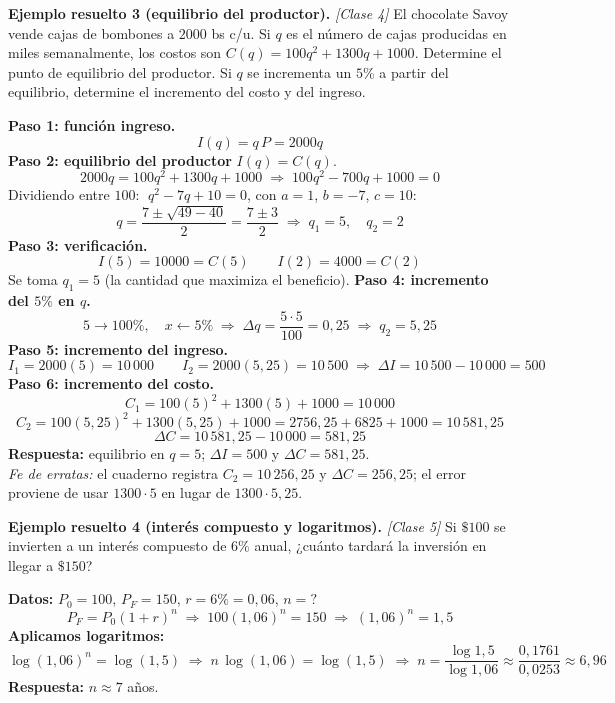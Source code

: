\documentclass[12pt, letterpaper]{article}
\begin{document}
\noindent\textbf{Ejemplo resuelto 3 (equilibrio del productor).} \emph{[Clase 4]}
El chocolate Savoy vende cajas de bombones a $2000$ bs c/u. Si $q$ es el número de cajas producidas en miles semanalmente, los costos son $C(q) = 100q^{2} + 1300q + 1000$. Determine el punto de equilibrio del productor. Si $q$ se incrementa un $5\%$ a partir del equilibrio, determine el incremento del costo y del ingreso.

\begin{cuadrosolucion}
  \textbf{Paso 1: función ingreso.}
  \[
    I(q) = q\,P = 2000q
  \]
  \textbf{Paso 2: equilibrio del productor} $I(q) = C(q)$.
  \[
    2000q = 100q^{2} + 1300q + 1000
    \;\Longrightarrow\; 100q^{2} - 700q + 1000 = 0
  \]
  Dividiendo entre $100$: $\;q^{2} - 7q + 10 = 0$, con $a=1$, $b=-7$, $c=10$:
  \[
    q = \frac{7 \pm \sqrt{49 - 40}}{2} = \frac{7 \pm 3}{2}
    \;\Longrightarrow\; q_1 = 5, \quad q_2 = 2
  \]
  \textbf{Paso 3: verificación.}
  \[
    I(5) = 10000 = C(5)
    \qquad
    I(2) = 4000 = C(2)
  \]
  Se toma $q_1 = 5$ (la cantidad que maximiza el beneficio).
  \textbf{Paso 4: incremento del $5\%$ en $q$.}
  \[
    5 \to 100\%, \quad x \leftarrow 5\%
    \;\Longrightarrow\; \Delta q = \frac{5 \cdot 5}{100} = 0{,}25
    \;\Longrightarrow\; q_2 = 5{,}25
  \]
  \textbf{Paso 5: incremento del ingreso.}
  \[
    I_1 = 2000(5) = 10\,000
    \qquad
    I_2 = 2000(5{,}25) = 10\,500
    \;\Longrightarrow\; \Delta I = 10\,500 - 10\,000 = 500
  \]
  \textbf{Paso 6: incremento del costo.}
  \[
    C_1 = 100(5)^{2} + 1300(5) + 1000 = 10\,000
  \]
  \[
    C_2 = 100(5{,}25)^{2} + 1300(5{,}25) + 1000
        = 2756{,}25 + 6825 + 1000 = 10\,581{,}25
  \]
  \[
    \Delta C = 10\,581{,}25 - 10\,000 = 581{,}25
  \]
  \textbf{Respuesta:} equilibrio en $q=5$; $\Delta I = 500$ y $\Delta C = 581{,}25$.
  \\[2pt]
  \textit{Fe de erratas:} el cuaderno registra $C_2 = 10\,256{,}25$ y $\Delta C = 256{,}25$; el error proviene de usar $1300 \cdot 5$ en lugar de $1300 \cdot 5{,}25$.
\end{cuadrosolucion}

\noindent\textbf{Ejemplo resuelto 4 (interés compuesto y logaritmos).} \emph{[Clase 5]}
Si $\$100$ se invierten a un interés compuesto de $6\%$ anual, ¿cuánto tardará la inversión en llegar a $\$150$?

\begin{cuadrosolucion}
  \textbf{Datos:} $P_0 = 100$, $P_F = 150$, $r = 6\% = 0{,}06$, $n = ?$
  \[
    P_F = P_0(1+r)^{n}
    \;\Longrightarrow\; 100(1{,}06)^{n} = 150
    \;\Longrightarrow\; (1{,}06)^{n} = 1{,}5
  \]
  \textbf{Aplicamos logaritmos:}
  \[
    \log(1{,}06)^{n} = \log(1{,}5)
    \;\Longrightarrow\; n\,\log(1{,}06) = \log(1{,}5)
    \;\Longrightarrow\; n = \frac{\log 1{,}5}{\log 1{,}06} \approx \frac{0{,}1761}{0{,}0253} \approx 6{,}96
  \]
  \textbf{Respuesta:} $n \approx 7$ años.
\end{cuadrosolucion}
\end{document}

